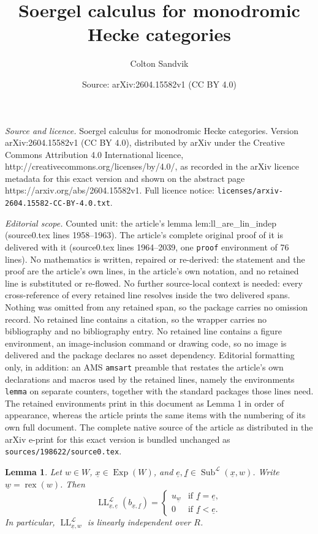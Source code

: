 \documentclass[10pt,a4paper]{amsart}
\title{Soergel calculus for monodromic Hecke categories}
\author{Colton Sandvik}
\date{Source: arXiv:2604.15582v1 (CC BY 4.0)}
\newtheorem{lemma}{Lemma}
\DeclareMathOperator{\Exp}{Exp}
\DeclareMathOperator{\LL}{LL}
\DeclareMathOperator{\Subexp}{Sub}
\DeclareMathOperator{\rex}{rex}
\newcommand{\scrL}{\mathcal{L}}
\newcommand{\ue}{\underline{e}}
\newcommand{\uf}{\underline{f}}
\newcommand{\uw}{\underline{w}}
\newcommand{\ux}{\underline{x}}
\begin{document}
\maketitle

\noindent\emph{Source and licence.} Soergel calculus for monodromic Hecke categories. Version arXiv:2604.15582v1 (CC BY 4.0), distributed by arXiv under the Creative Commons Attribution 4.0 International licence, http://creativecommons.org/licenses/by/4.0/, as recorded in the arXiv licence metadata for this exact version and shown on the abstract page https://arxiv.org/abs/2604.15582v1. Full licence notice: \texttt{licenses/arxiv-2604.15582-CC-BY-4.0.txt}.\par\smallskip

\noindent\textit{Editorial scope.} Counted unit: the article's lemma lem:ll\_are\_lin\_indep (source0.tex lines 1958--1963). The article's complete original proof of it is delivered with it (source0.tex lines 1964--2039, one \texttt{proof} environment of 76 lines). No mathematics is written, repaired or re-derived: the statement and the proof are the article's own lines, in the article's own notation, and no retained line is substituted or re-flowed.  No further source-local context is needed: every cross-reference of every retained line resolves inside the two delivered spans.  Nothing was omitted from any retained span, so the package carries no omission record.  No retained line contains a citation, so the wrapper carries no bibliography and no bibliography entry.  No retained line contains a figure environment, an image-inclusion command or drawing code, so no image is delivered and the package declares no asset dependency.  Editorial formatting only, in addition: an AMS \texttt{amsart} preamble that restates the article's own declarations and macros used by the retained lines, namely the environments \texttt{lemma} on separate counters, together with the standard packages those lines need.  The retained environments print in this document as Lemma 1 in order of appearance, whereas the article prints the same items with the numbering of its own full document.  The complete native source of the article as distributed in the arXiv e-print for this exact version is bundled unchanged as \texttt{sources/198622/source0.tex}.
\begin{lemma}\label{lem:ll_are_lin_indep}
    Let $w \in W$, $\ux \in \Exp (W)$, and $\ue, \uf \in \Subexp^{\scrL} (\ux, w)$. Write $\uw = \rex (w)$.
    Then
    \[\LL_{\ux, \ue}^{\scrL} (b_{\ux, \uf}) = \begin{cases} u_{\uw} & \text{if } \uf = \ue, \\ 0 & \text{if } \uf < \ue. \end{cases}\]
    In particular, $\LL_{\ux, w}^{\scrL}$ is linearly independent over $R$.
\end{lemma}
\end{document}
